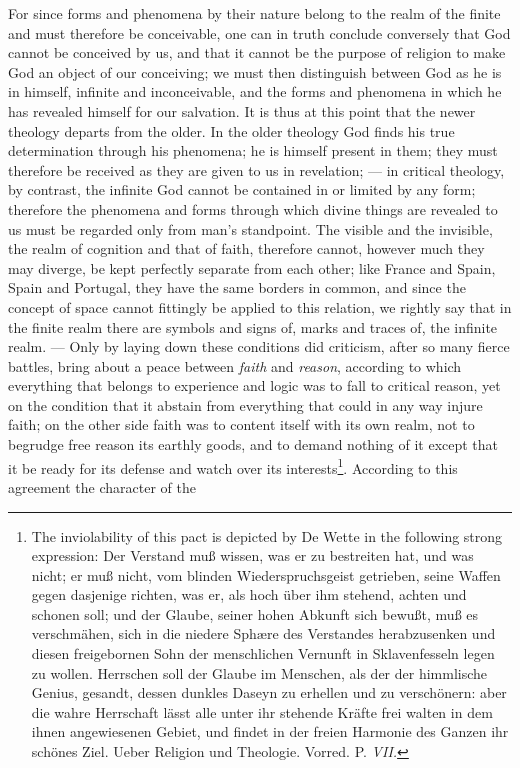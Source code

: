 \documentclass[12pt]{book}
\newcommand{\opage}[1]{\marginnote{\footnotesize\textit{[#1]}}}
\begin{document}
For since forms and phenomena by their nature belong to the realm of the finite
and must therefore be conceivable, one can in truth conclude conversely that
God cannot be conceived by us, and that it cannot be the purpose of religion to
make God an object of our conceiving; we must then distinguish between God as
he is in himself, infinite and inconceivable, and the forms and phenomena in
which he has revealed himself for our salvation. It is thus at this point that
the newer theology departs from the older. In the older theology God finds his
true determination through his phenomena; he is himself present in them; they
must therefore be received as they are given to us in revelation; --- in
critical theology, by contrast, the infinite God cannot be contained in or
limited by any form; therefore the phenomena
\opage{99}\setcounter{footnote}{0}%
and forms through which divine things are revealed to us must be regarded only
from man's standpoint. The visible and the invisible, the realm of cognition
and that of faith, therefore cannot, however much they may diverge, be kept
perfectly separate from each other; like France and Spain, Spain and Portugal,
they have the same borders in common, and since the concept of space cannot
fittingly be applied to this relation, we rightly say that in the finite realm
there are symbols and signs of, marks and traces of, the infinite realm. ---
Only by laying down these conditions did criticism, after so many fierce
battles, bring about a peace between \emph{faith} and \emph{reason}, according
to which everything that belongs to experience and logic was to fall to
critical reason, yet on the condition that it abstain from everything that
could in any way injure faith; on the other side faith was to content itself
with its own realm, not to begrudge free reason its earthly goods, and to
demand nothing of it except that it be ready for its defense and watch over
its interests\footnote{The inviolability of this pact is depicted by De Wette
in the following strong expression: Der Verstand
muß wissen, was er zu bestreiten hat, und was nicht; er muß nicht, vom blinden
Wiederspruchsgeist getrieben, seine Waffen gegen dasjenige richten, was er,
als hoch über ihm stehend, achten und schonen soll; und der Glaube, seiner
hohen Abkunft sich bewußt, muß es verschmähen, sich in die niedere Sphære des
Verstandes herabzusenken und diesen freigebornen Sohn der menschlichen
Vernunft in Sklavenfesseln legen zu wollen. Herrschen soll der Glaube im
Menschen, als der der himmlische Genius, gesandt, dessen dunkles Daseyn zu
erhellen und zu verschönern: aber die wahre Herrschaft lässt alle unter ihr
stehende Kräfte frei walten in dem ihnen angewiesenen Gebiet, und findet in
der freien Harmonie des Ganzen ihr schönes Ziel. Ueber Religion und Theologie.
Vorred. P. \textit{VII.}}. According to this agreement the character of the
\end{document}
